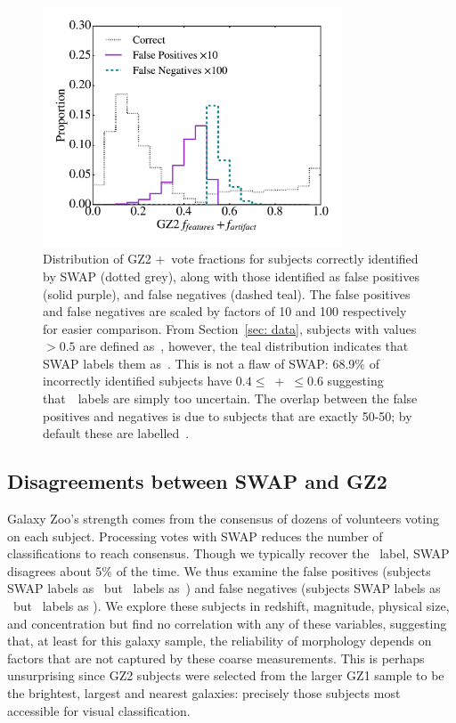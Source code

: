 \begin{figure}[t!]
\includegraphics[width=3.5in]{Figures/human_machine/f5.pdf}
\caption[SWAP's prediction disagrees with the GZ2 label as a result of the confidence interval around the chosen threshold used to define the GZ2 label.]{Distribution of GZ2 \ffeat+\fstar~vote fractions for subjects correctly identified by SWAP (dotted grey), along with those identified as false positives (solid purple), and false negatives (dashed teal). 
The false positives and false negatives are scaled by factors of 10 and 100 respectively for easier comparison. From Section~\ref{sec: data}, subjects with values $> 0.5$ are defined as~\feat, however, the teal distribution indicates that SWAP labels them as~\notfeat. This is not a flaw of SWAP: 68.9\% of incorrectly identified subjects have $0.4 \le $~\ffeat +\fstar~$ \le 0.6$ suggesting that~\raw~labels are simply too uncertain. The overlap between the false positives and negatives is due to subjects that are exactly 50-50; by default these are labelled~\notfeat. \label{fig: SWAP sucks}}
\end{figure}


\subsection{Disagreements between SWAP and GZ2}\label{sec: swap gz2 disagree}

Galaxy Zoo's strength comes from the consensus of dozens of volunteers voting on each subject. Processing votes with SWAP reduces the number of classifications to reach consensus. Though we typically recover the \raw~label, SWAP disagrees about 5\% of the time. We thus examine the false positives (subjects SWAP labels as \feat~but \raw~labels as~\notfeat) and false negatives (subjects SWAP labels as \notfeat~but \raw~labels as \feat). We explore these subjects in redshift, magnitude, physical size, and concentration but find no correlation with any of these variables, suggesting that, at least for this galaxy sample, the reliability of morphology depends on factors that are not captured by these coarse measurements. This is perhaps unsurprising since GZ2 subjects were selected from the larger GZ1 sample to be the brightest, largest and nearest galaxies:  precisely those subjects most accessible for visual classification. 

